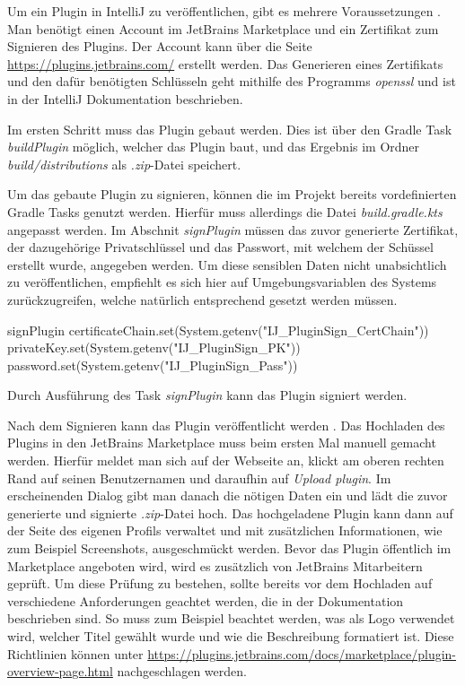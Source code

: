 Um ein Plugin in IntelliJ zu veröffentlichen, gibt es mehrere Voraussetzungen
\cite{IntelliJPlatformSDKPluginSigning}.
Man benötigt einen Account im JetBrains Marketplace und ein Zertifikat
zum Signieren des Plugins. Der Account kann über die Seite 
\url{https://plugins.jetbrains.com/} erstellt werden. Das Generieren eines
Zertifikats und den dafür benötigten Schlüsseln geht mithilfe des 
Programms \emph{openssl} und ist in der IntelliJ Dokumentation beschrieben.

Im ersten Schritt muss das Plugin gebaut werden. Dies ist über den
Gradle Task \emph{buildPlugin} möglich, welcher das Plugin baut, und
das Ergebnis im Ordner \emph{build/distributions} als \emph{.zip}-Datei
speichert.

Um das gebaute Plugin zu signieren, können die im Projekt bereits vordefinierten
Gradle Tasks genutzt werden. Hierfür muss allerdings die Datei 
\emph{build.gradle.kts} angepasst werden. Im Abschnit \emph{signPlugin}
müssen das zuvor generierte Zertifikat, der dazugehörige Privatschlüssel
und das Passwort, mit welchem der Schüssel erstellt wurde, angegeben werden.
Um diese sensiblen Daten nicht unabsichtlich zu veröffentlichen, empfiehlt
es sich hier auf Umgebungsvariablen des Systems zurückzugreifen, welche
natürlich entsprechend gesetzt werden müssen.
\begin{JsCode}[numbers=none]
    signPlugin {
        certificateChain.set(System.getenv("IJ_PluginSign_CertChain"))
        privateKey.set(System.getenv("IJ_PluginSign_PK"))
        password.set(System.getenv("IJ_PluginSign_Pass"))
    }
\end{JsCode}
Durch Ausführung des Task \emph{signPlugin} kann das Plugin signiert werden.

Nach dem Signieren kann das Plugin veröffentlicht werden
\cite{IntelliJPlatformSDKPublishingAPlugin}.
Das Hochladen des Plugins in den JetBrains Marketplace muss beim ersten Mal
manuell gemacht werden. Hierfür meldet man sich auf der Webseite an,
klickt am oberen rechten Rand auf seinen Benutzernamen und daraufhin
auf \emph{Upload plugin}. Im erscheinenden Dialog gibt man
danach die nötigen Daten ein und lädt die zuvor generierte und signierte
\emph{.zip}-Datei hoch.
Das hochgeladene Plugin kann dann auf der Seite des eigenen Profils
verwaltet und mit zusätzlichen Informationen, wie zum Beispiel Screenshots,
ausgeschmückt werden.
Bevor das Plugin öffentlich im Marketplace angeboten wird, wird es 
zusätzlich von JetBrains Mitarbeitern geprüft. Um diese Prüfung
zu bestehen, sollte bereits vor dem Hochladen auf verschiedene
Anforderungen geachtet werden, die in der Dokumentation beschrieben sind.
So muss zum Beispiel beachtet werden, was als Logo verwendet wird, welcher
Titel gewählt wurde und wie die Beschreibung formatiert ist.
Diese Richtlinien können unter \url{https://plugins.jetbrains.com/docs/marketplace/plugin-overview-page.html}
nachgeschlagen werden.

